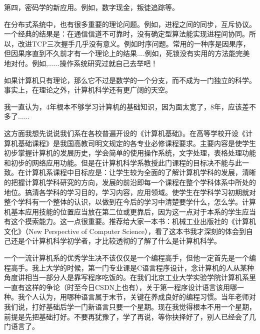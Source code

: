 第四，密码学的新应用。例如，数字现金，叛徒追踪等。


在分布式系统中，也有很多重要的理论问题。例如，进程之间的同步，互斥协议。一个经典的结果是：在通信信道不可靠时，没有确定型算法能实现进程间协同。所以，改进TCP三次握手几乎没有意义。例如时序问题。常用的一种序是因果序，但因果序直到不久前才有一个理论上的结果....例如，死锁没有实用的方法能完美地对付。例如,......操作系统研究过就自己去举吧！


如果计算机只有理论，那么它不过是数学的一个分支，而不成为一门独立的科学。事实上，在理论之外，计算机科学还有更广阔的天空。


我一直认为，4年根本不够学习计算机的基础知识，因为面太宽了，8年，应该差不多了......


这方面我想先说说我们系在各校普遍开设的《计算机基础》。在高等学校开设《计算机基础课程》是我国高教司明文规定的各专业必修课程要求。主要内容是使学生初步掌握计算机的发展历史，学会简单的使用操作系统，文字处理，表格处理功能和初步的网络应用功能。但是在计算机科学系教授此门课程的目标决不能与此一致。在计算机系课程中目标应是：让学生较为全面的了解计算机学科的发展，清晰的把握计算机学科研究的方向，发展的前沿即每一个课程在整个学科体系中所处的地位。搞清各学科的学习目的，学习内容，应用领域。使学生在学科学习初期就对整个学科有一个整体的认识，以做到在今后的学习中清楚要学什么，怎么学。计算机基本应用技能的位置应当放在第二位或更靠后，因为这一点对于本系的学生应当有这个摸索能力。这一点很重要。推荐给大家一本书：机械工业出版社的《计算机文化》（New Perspective of Computer Science），看了这本书我才深刻的体会到自己还是个计算机科学初学者，才比较透彻的了解了什么是计算机科学。


一个一流计算机系的优秀学生决不该仅仅是一个编程高手，但他一定首先是一个编程高手。我上大学的时候，第一门专业课是C语言程序设计，念计算机的人从某种角度讲相当一部分人是靠写程序吃饭的。在我们北京工业大学实验学院计算机系里一直有这样的争论（时至今日CSDN上也有），关于第一程序设计语言该用哪一种。我个人认为，用哪种语言属于末节，关键在养成良好的编程习惯。当年老师对我们说，打好基础后学一门新语言只要一个星期。现在我觉得根本不用一个星期，前提是先把基础打好。不要再犹豫了，学了再说，等你抉择好了，别人已经会了几门语言了。



